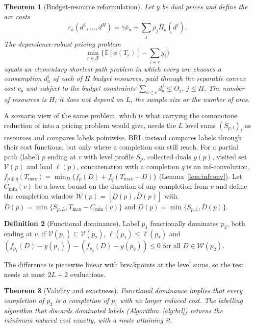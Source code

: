 \documentclass[preprint,11pt]{elsarticle}
\newtheorem{theorem}{Theorem}
\theoremstyle{definition}
\newtheorem{definition}[theorem]{Definition}
\theoremstyle{remark}
\newcommand{\cR}{\mathcal{R}}
\newcommand{\Eu}{\overline{\mathbb{E}}}
\newcommand{\Pib}{\overline{\Pi}}
\newcommand{\xb}{\bar x}
\newcommand{\Dl}{\underline{D}}
\newcommand{\Dh}{\overline{D}}
\begin{document}
\begin{theorem}[Budget-resource reformulation]\label{thm:resource}
Let $y$ be dual prices and define the arc costs \[c_a(d^1,\dots,d^H)=\gamma\xb_a+\sum_j\rho_j\Pib_a(d^j).\] The dependence-robust pricing problem \[\min_{r\in\cR}\Big\{\Eu[\phi(T_r)]-\sum_{i\in r}y_i\Big\}\] equals an elementary shortest path problem in which every arc chooses a consumption $d^j_a$ of each of $H$ budget resources, paid through the separable convex cost $c_a$ and subject to the budget constraints $\sum_{a\in r}d^j_a\le\Theta_j$, $j\le H$. The number of resources is $H$; it does not depend on $L$, the sample size or the number of arcs.
\end{theorem}

A scenario view of the same problem, which is what carrying the comonotone reduction of \citet{GhosalHoWiesemann2024} into a pricing problem would give, needs the $L$ level sums $(S_{p,l})_l$ as resources and compares labels pointwise. BRL instead compares labels through their cost functions, but only where a completion can still reach. For a partial path (label) $p$ ending at $v$ with level profile $S_p$, collected duals $y(p)$, visited set $\mathcal V(p)$ and load $\ell(p)$, concatenation with a completion $q$ is an inf-convolution, $f_{p\oplus q}(T_{\max})=\min_D\{f_p(D)+f_q(T_{\max}-D)\}$ (Lemma~\ref{lem:infconv}). Let $C_{\min}(v)$ be a lower bound on the duration of any completion from $v$ and define the completion window $\mathcal W(p)=[\Dl(p),\Dh(p)]$ with $\Dh(p)=\min\{S_{p,L},T_{\max}-C_{\min}(v)\}$ and $\Dl(p)=\min\{S_{p,1},\Dh(p)\}$.

\begin{definition}[Functional dominance]\label{def:fdom}
Label $p_1$ functionally dominates $p_2$, both ending at $v$, if $\mathcal V(p_1)\subseteq\mathcal V(p_2)$, $\ell(p_1)\le\ell(p_2)$ and $(f_{p_1}(D)-y(p_1))-(f_{p_2}(D)-y(p_2))\le0$ for all $D\in\mathcal W(p_2)$.
\end{definition}

The difference is piecewise linear with breakpoints at the level sums, so the test needs at most $2L+2$ evaluations.

\begin{theorem}[Validity and exactness]\label{thm:fdom}
Functional dominance implies that every completion of $p_2$ is a completion of $p_1$ with no larger reduced cost. The labelling algorithm that discards dominated labels (Algorithm~\ref{alg:brl}) returns the minimum reduced cost exactly, with a route attaining it.
\end{theorem}
\end{document}
